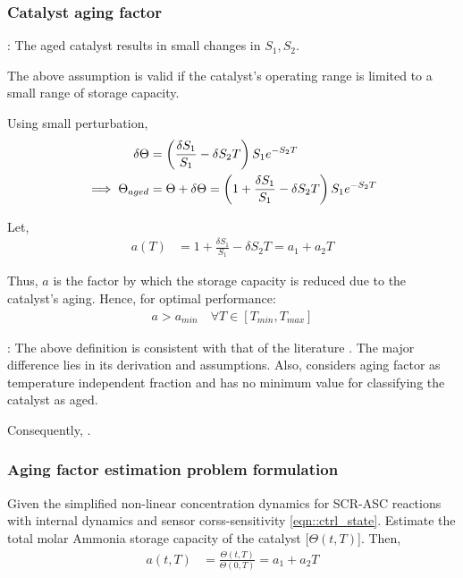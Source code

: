 \subsubsection{Catalyst aging factor}

: The aged catalyst results in small changes in
$S_1, S_2$.

The above assumption is valid if the catalyst's operating range is limited to a
small range of storage capacity.

Using small perturbation,
\begin{align*}
    \delta \Theta &= \left( \frac{\delta S_1}{S_1} - \delta S_2T \right) S_1 e^{-S_2 T}\\
    \implies \Theta_{aged} &= \Theta + \delta \Theta = \left( 1 + \frac{\delta S_1}{S_1} - \delta S_2T \right) S_1 e^{-S_2 T}
\end{align*}

Let,
\begin{align*}
    a(T) &= 1 + \frac{\delta S_1}{S_1} - \delta S_2T = a_1 + a_2 T
\end{align*}

Thus, $a$ is the factor by which the storage capacity is reduced due to the
catalyst's aging. Hence, for optimal performance:
\begin{align*}
    a > a_{min} \quad \forall T \in [T_{min}, T_{max}]
\end{align*}

: The above definition is consistent with that of the literature
\cite{ma2017observer}. The major difference lies in its derivation and
assumptions. Also, \cite{ma2017observer} considers aging factor as temperature
independent fraction and has no minimum value for classifying the catalyst as aged.

Consequently, .


\subsubsection{Aging factor estimation problem formulation}
Given the simplified non-linear concentration dynamics for SCR-ASC
reactions with internal dynamics and sensor corss-sensitivity
\ref{eqn::ctrl_state}. Estimate the total molar
Ammonia storage capacity of the catalyst [$\Theta(t, T)$]. Then,
\begin{align*}
    a(t, T) &= \frac{\Theta(t, T)}{\Theta(0, T)} = a_1 + a_2 T
\end{align*}


